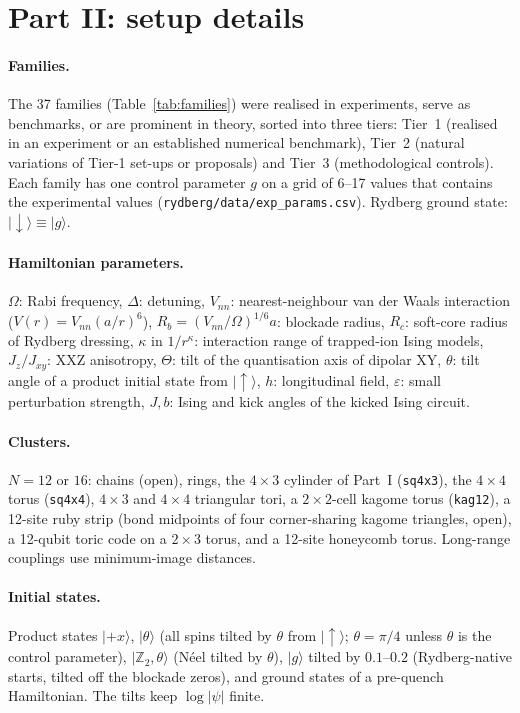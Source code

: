 \documentclass[11pt,a4paper]{article}
\begin{document}
\FloatBarrier
\section{Part II: setup details}
\label{app:rydsetup}

\paragraph{Families.} The 37 families (Table~\ref{tab:families}) were realised in experiments, serve as benchmarks,
or are prominent in theory, sorted into three tiers: Tier~1 (realised in an experiment or an established numerical
benchmark), Tier~2 (natural variations of Tier-1 set-ups or proposals) and Tier~3 (methodological controls). Each
family has one control parameter $g$ on a grid of 6--17 values that contains the experimental values
(\texttt{rydberg/data/exp\_params.csv}). Rydberg ground state: $|{\downarrow}\rangle\equiv|g\rangle$.

\paragraph{Hamiltonian parameters.}
$\Omega$: Rabi frequency, $\Delta$: detuning, $V_{nn}$: nearest-neighbour van der Waals interaction ($V(r)=V_{nn}(a/r)^6$),
$R_b=(V_{nn}/\Omega)^{1/6}a$: blockade radius, $R_c$: soft-core radius of Rydberg dressing, $\kappa$ in $1/r^\kappa$:
interaction range of trapped-ion Ising models, $J_z/J_{xy}$: XXZ anisotropy, $\Theta$: tilt of the quantisation axis
of dipolar XY, $\theta$: tilt angle of a product initial state from $|{\uparrow}\rangle$, $h$: longitudinal field,
$\varepsilon$: small perturbation strength, $J,b$: Ising and kick angles of the kicked Ising circuit.


\paragraph{Clusters.} $N=12$ or $16$: chains (open), rings, the $4\times3$ cylinder of Part~I (\texttt{sq4x3}), the
$4\times4$ torus (\texttt{sq4x4}), $4\times3$ and $4\times4$ triangular tori, a $2\times2$-cell kagome torus
(\texttt{kag12}), a 12-site ruby strip (bond midpoints of four corner-sharing kagome triangles, open), a 12-qubit
toric code on a $2\times3$ torus, and a 12-site honeycomb torus. Long-range couplings use minimum-image distances.

\paragraph{Initial states.} Product states $|{+}x\rangle$, $|\theta\rangle$ (all spins tilted by $\theta$ from
$|{\uparrow}\rangle$; $\theta=\pi/4$ unless $\theta$ is the control parameter), $|\mathbb Z_2,\theta\rangle$ (Néel
tilted by $\theta$), $|g\rangle$ tilted by $0.1$--$0.2$ (Rydberg-native starts, tilted off the blockade zeros), and
ground states of a pre-quench Hamiltonian. The tilts keep $\log|\psi|$ finite.
\end{document}
